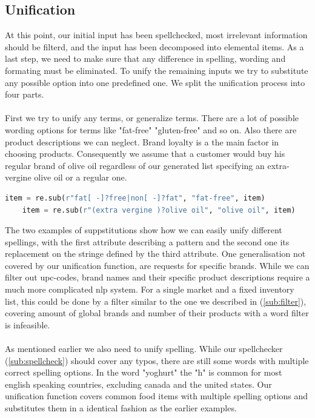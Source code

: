 \subsection{Unification}\label{sub:unify}
At this point, our initial input has been spellchecked, most irrelevant information should be filterd, and the input has been decomposed into elemental items.
As a last step, we need to make sure that any difference in spelling, wording and formating must be eliminated.
To unify the remaining inputs we try to substitute any possible option into one predefined one. We split the unification process into four parts.\\\\
First we try to unify any terms, or generalize terms.
There are a lot of possible wording options for terms like "fat-free" "gluten-free" and so on. Also there are product descriptions we can neglect. Brand loyalty is a the main factor in choosing products\cite{doi:10.1080/02642069600000006}. Consequently we assume that a customer would buy his regular brand of olive oil regardless of our  generated list specifying an extra-vergine olive oil or a regular one.
\begin{lstlisting}[language = python]
    item = re.sub(r"fat[ -]?free|non[ -]?fat", "fat-free", item)
	item = re.sub(r"(extra vergine )?olive oil", "olive oil", item)
\end{lstlisting}
The two examples of suppstitutions show how we can easily unify different spellings, with the first attribute describing a pattern and the second one its replacement on the stringe defined by the third attribute.
One generalisation not covered by our unification function, are requests for specific brands. While we can filter out upc-codes, brand names and their specific product descriptions require a much more complicated nlp system. For a single market and a fixed inventory list, this could be done by a filter similar to the one we described in (\ref{sub:filter}), covering amount of global brands and number of their products with a word filter is infeasible.\\\\
As mentioned earlier we also need to unify spelling. While our spellchecker (\ref{sub:spellcheck}) should cover any typos, there are still some words with multiple correct spelling options. In the word "yoghurt" the "h" is common for most english speaking countries, excluding canada and the united states. Our unification function covers common food items with multiple spelling options and substitutes them in a identical fashion as the earlier examples.\\\\
